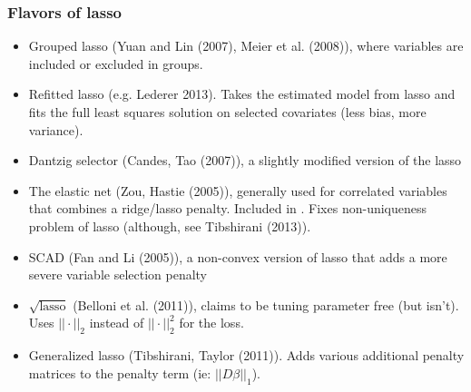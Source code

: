\documentclass{beamer}
\begin{document}
%
\begin{frame}[fragile]
\frametitle{Flavors of lasso}
\begin{itemize}
\item Grouped lasso (Yuan and Lin (2007), Meier et al. (2008)), where variables are included
or excluded in groups.
\item Refitted lasso (e.g. Lederer 2013).  Takes the estimated model from lasso and fits the full
least squares solution on selected covariates (less bias, more variance).
\item Dantzig selector (Candes, Tao (2007)), a slightly modified version of the lasso
\item The elastic net (Zou, Hastie (2005)), generally used for correlated variables that
combines a ridge/lasso penalty.  Included in .  Fixes non-uniqueness problem
of lasso (although, see Tibshirani (2013)).  
\item SCAD (Fan and Li (2005)), a non-convex version of lasso that adds a more severe variable selection penalty
\item $\sqrt{\textrm{lasso}}$ (Belloni et al. (2011)), claims to be tuning parameter free (but isn't).  Uses $||\cdot||_2$
instead of $||\cdot||_2^2$ for the loss.
\item Generalized lasso (Tibshirani, Taylor (2011)).  Adds various additional penalty matrices to the penalty term (ie: 
$||D\beta||_1$).  
\end{itemize}

\end{frame}
\end{document}
